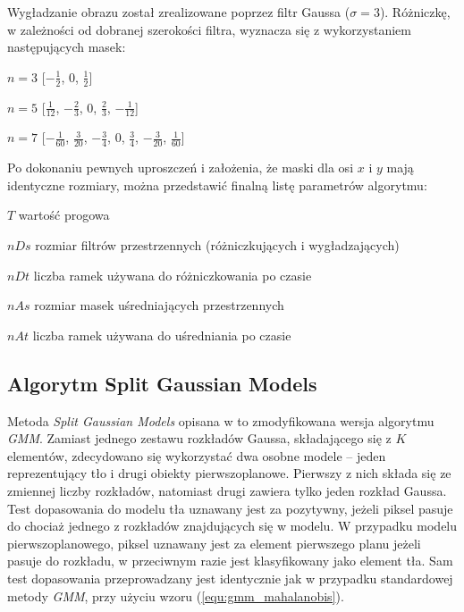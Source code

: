 Wygładzanie obrazu został zrealizowane poprzez filtr Gaussa ($\sigma = 3$). 
Różniczkę, w zależności od dobranej szerokości filtra, wyznacza się z wykorzystaniem następujących masek:
\begin{eqwhere}[2cm]
	\item[$n=3$] [$-\frac{1}{2}$, $0$, $\frac{1}{2}$]
	\item[$n=5$] [$\frac{1}{12}$, $-\frac{2}{3}$, $0$, $\frac{2}{3}$, $-\frac{1}{12}$]
	\item[$n=7$] [$-\frac{1}{60}$, $\frac{3}{20}$, $-\frac{3}{4}$, $0$, $\frac{3}{4}$, $-\frac{3}{20}$, $\frac{1}{60}$]\\
\end{eqwhere}

Po dokonaniu pewnych uproszczeń i założenia, że maski dla osi $x$ i $y$ mają identyczne rozmiary, można przedstawić finalną listę parametrów algorytmu:
\begin{eqwhere}[2cm]
	\item[$T$]	 wartość progowa
	\item[$nDs$]  rozmiar filtrów przestrzennych (różniczkujących i wygładzających)
	\item[$nDt$]  liczba ramek używana do różniczkowania po czasie
	\item[$nAs$]  rozmiar masek uśredniających przestrzennych
	\item[$nAt$]  liczba ramek używana do uśredniania po czasie\\
\end{eqwhere}

\subsection{Algorytm Split Gaussian Models}
\label{subsec:split_gaussian_opis}

Metoda \textit{Split Gaussian Models} opisana w \cite{janus_15} to zmodyfikowana wersja algorytmu \textit{GMM}. 
Zamiast jednego zestawu rozkładów Gaussa, składającego się z $K$ elementów, zdecydowano się wykorzystać dwa osobne modele -- jeden reprezentujący tło i drugi obiekty pierwszoplanowe. 
Pierwszy z nich składa się ze zmiennej liczby rozkładów, natomiast drugi zawiera tylko jeden rozkład Gaussa. 
Test dopasowania do modelu tła uznawany jest za pozytywny, jeżeli piksel pasuje do chociaż jednego z rozkładów znajdujących się w modelu.
W przypadku modelu pierwszoplanowego, piksel uznawany jest za element pierwszego planu jeżeli pasuje do rozkładu, w przeciwnym razie jest klasyfikowany jako element tła. 
Sam test dopasowania przeprowadzany jest identycznie jak w przypadku standardowej metody \textit{GMM}, przy użyciu wzoru (\ref{equ:gmm_mahalanobis}).


